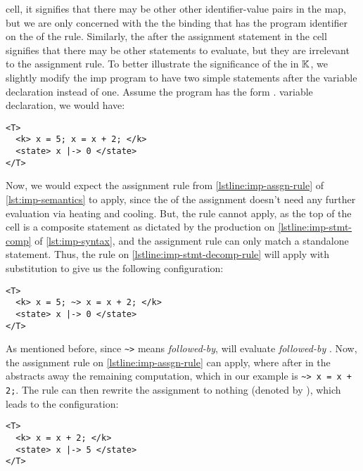 cell, it signifies that there may be other other identifier-value
pairs in the map, but we are only concerned with the
the binding that has the program identifier on the \LHS{} of
the rule. Similarly, the  after the assignment statement
in the  cell signifies that there may be other statements
to evaluate, but they are irrelevant to the assignment rule.
To better illustrate the significance of the  in $\mathbb{K}$,
we slightly modify the imp program to have two simple statements
after the variable declaration instead of one.
Assume the program has the form .
variable declaration, we would have:
\begin{lstlisting}[language=k,style=ksty]
<T>
  <k> x = 5; x = x + 2; </k>
  <state> x |-> 0 </state>
</T>
\end{lstlisting}
Now, we would expect the assignment rule from \autoref{lstline:imp-assgn-rule}
of \autoref{lst:imp-semantics} to apply, since the \RHS{} of
the assignment  doesn't need any further
evaluation via heating and cooling.
But, the rule cannot apply, as the top of the  cell
is a composite statement as dictated by the production on
\autoref{lstline:imp-stmt-comp} of \autoref{lst:imp-syntax},
and the assignment rule can
only match a standalone statement. Thus, the rule on
\autoref{lstline:imp-stmt-decomp-rule} will apply with
substitution
to give us the following configuration:
\begin{lstlisting}[language=k,style=ksty]
<T>
  <k> x = 5; ~> x = x + 2; </k>
  <state> x |-> 0 </state>
</T>
\end{lstlisting}
As mentioned before, since \lstinline[style=ksty]{~>} means
\emph{followed-by}, \K{} will evaluate 
\emph{followed-by} . Now, the assignment
rule on \autoref{lstline:imp-assgn-rule} can apply,
where  after  in the 
abstracts away the remaining computation, which in our example
is \lstinline[style=ksty]{~> x = x + 2;}. The rule can then
rewrite the assignment  to nothing (denoted by
), which leads to the configuration:
\begin{lstlisting}[language=k,style=ksty]
<T>
  <k> x = x + 2; </k>
  <state> x |-> 5 </state>
</T>
\end{lstlisting}

